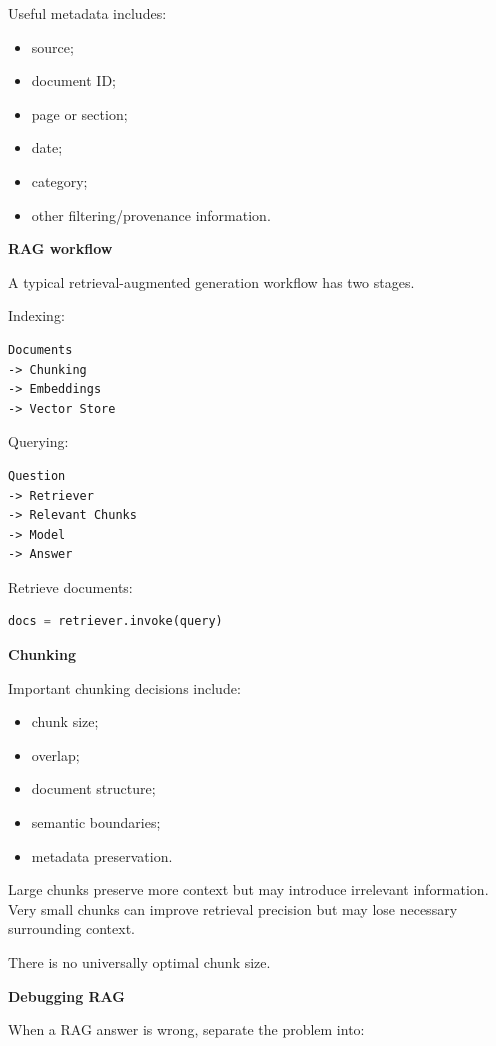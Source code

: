 \documentclass[11pt,letterpaper]{article}
\begin{document}
Useful metadata includes:

\begin{itemize}[leftmargin=*]
    \item source;
    \item document ID;
    \item page or section;
    \item date;
    \item category;
    \item other filtering/provenance information.
\end{itemize}

\textbf{RAG workflow}

A typical retrieval-augmented generation workflow has two stages.

Indexing:

\begin{lstlisting}
Documents
-> Chunking
-> Embeddings
-> Vector Store
\end{lstlisting}

Querying:

\begin{lstlisting}
Question
-> Retriever
-> Relevant Chunks
-> Model
-> Answer
\end{lstlisting}

Retrieve documents:

\begin{lstlisting}[language=Python]
docs = retriever.invoke(query)
\end{lstlisting}

\textbf{Chunking}

Important chunking decisions include:

\begin{itemize}[leftmargin=*]
    \item chunk size;
    \item overlap;
    \item document structure;
    \item semantic boundaries;
    \item metadata preservation.
\end{itemize}

Large chunks preserve more context but may introduce irrelevant information.
Very small chunks can improve retrieval precision but may lose necessary
surrounding context.

There is no universally optimal chunk size.

\textbf{Debugging RAG}

When a RAG answer is wrong, separate the problem into:
\end{document}
